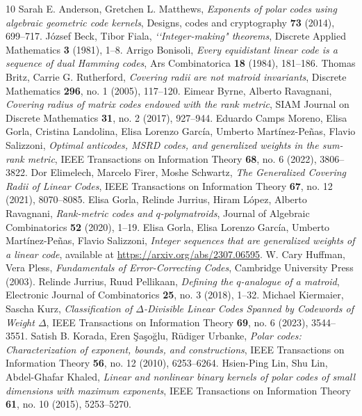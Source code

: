 \documentclass[12pt]{amsart}
\numberwithin{equation}{section}
\theoremstyle{definition}
\begin{document}
\begin{thebibliography}{10}
 Sarah E. Anderson, Gretchen L. Matthews, \emph{Exponents of polar codes using algebraic geometric code kernels}, Designs, codes and cryptography {\bf 73} (2014), 699--717.
 J\'ozsef Beck, Tibor Fiala, \emph{‘‘Integer-making" theorems}, Discrete Applied Mathematics {\bf 3} (1981), 1--8.
 Arrigo Bonisoli, \emph{Every equidistant linear code is a sequence of dual Hamming codes}, Ars Combinatorica {\bf 18} (1984), 181--186.
 Thomas Britz, Carrie G. Rutherford, 
\emph{Covering radii are not matroid invariants},
Discrete Mathematics {\bf 296}, no. 1 (2005), 117--120.
 Eimear Byrne, Alberto Ravagnani, 
\emph{Covering radius of matrix codes endowed with the rank metric}, 
SIAM Journal on Discrete Mathematics {\bf 31}, no. 2 (2017), 927--944.
 Eduardo Camps Moreno, Elisa Gorla, Cristina Landolina, Elisa Lorenzo García, Umberto Martínez-Peñas, Flavio Salizzoni, \emph{Optimal anticodes, MSRD codes, and generalized weights in the sum-rank metric}, IEEE Transactions on Information Theory {\bf 68}, no. 6 (2022), 3806--3822.
 Dor Elimelech, Marcelo Firer, Moshe Schwartz, \emph{The Generalized Covering Radii of Linear Codes},
IEEE Transactions on Information Theory {\bf 67}, no. 12 (2021), 8070--8085.
 Elisa Gorla, Relinde Jurrius, Hiram L\'opez, Alberto Ravagnani, \emph{Rank-metric codes and $q$-polymatroids},
Journal of Algebraic Combinatorics {\bf 52} (2020), 1--19.
 Elisa Gorla, Elisa Lorenzo García, Umberto Martínez-Peñas, Flavio Salizzoni, \emph{Integer sequences that are generalized weights of a linear code}, available at \url{https://arxiv.org/abs/2307.06595}.
 W. Cary Huffman, Vera Pless, \emph{Fundamentals of Error-Correcting Codes}, Cambridge University Press (2003).
 Relinde Jurrius, Ruud Pellikaan,
\emph{Defining the $q$-analogue of a matroid},
Electronic Journal of Combinatorics {\bf 25}, no. 3 (2018), 1--32.
 Michael Kiermaier, Sascha Kurz, \emph{Classification of $\Delta$-Divisible Linear Codes Spanned by Codewords of Weight $\Delta$}, IEEE Transactions on Information Theory {\bf 69}, no. 6 (2023), 3544--3551.
 Satish B. Korada, Eren Şaşoğlu, R\"udiger Urbanke, \emph{Polar codes: Characterization of exponent, bounds, and constructions}, IEEE Transactions on Information Theory \textbf{56}, no. 12 (2010), 6253--6264.
 Hsien-Ping Lin, Shu Lin, Abdel-Ghafar Khaled, \emph{Linear and nonlinear binary kernels of polar codes of small dimensions with maximum exponents}, IEEE Transactions on Information Theory \textbf{61}, no. 10 (2015), 5253--5270.

\end{thebibliography}
\end{document}
